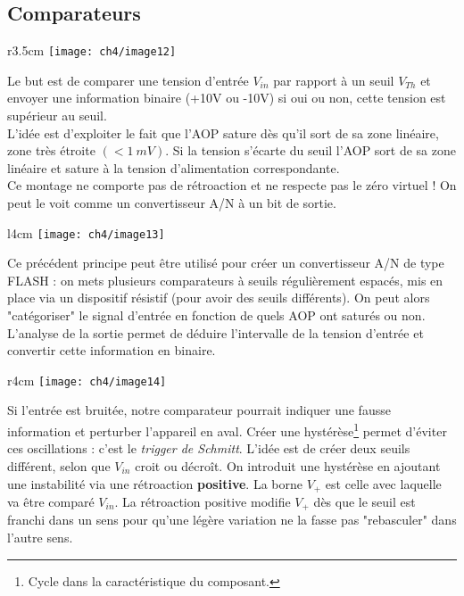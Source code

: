 	\subsection{Comparateurs}
	\begin{wrapfigure}[9]{r}{3.5cm}
	\vspace{-0.5cm}
	\texttt{[image: ch4/image12]}
	\end{wrapfigure}
	Le but est de comparer une tension d'entrée $V_{in}$ par rapport à
	un seuil $V_{Th}$ et envoyer une information binaire (+10V ou -10V) 
	si oui ou non, cette tension est supérieur au seuil. \\
	L'idée est d'exploiter le fait que l'AOP sature dès qu'il sort de sa zone 
	linéaire, zone très étroite $(<1\ mV)$. Si la tension s'écarte du seuil 
	l'AOP sort de sa zone linéaire et sature à la tension d'alimentation 
	correspondante.\\
	\danger Ce montage ne comporte pas de rétroaction et ne respecte pas le 
	zéro virtuel ! On peut le voit comme un convertisseur A/N à un bit de 
	sortie.\\

	\begin{wrapfigure}[9]{l}{4cm}
	\vspace{-0.98cm}
	\texttt{[image: ch4/image13]}
	\end{wrapfigure}	
	Ce précédent principe peut être utilisé pour créer un convertisseur A/N 
	de type FLASH : on mets plusieurs comparateurs à seuils régulièrement 
	espacés, mis en place via un dispositif résistif (pour avoir des seuils 
	différents). On peut alors "catégoriser" le signal d'entrée en fonction 
	de quels AOP ont saturés ou non. L'analyse de la sortie permet de déduire 
	l'intervalle de la tension d'entrée et convertir cette information en 
	binaire.\\

	\begin{wrapfigure}[6]{r}{4cm}
	\vspace{-0.98cm}
	\texttt{[image: ch4/image14]}
	\end{wrapfigure}		
	Si l'entrée est bruitée, notre comparateur pourrait indiquer une fausse 
	information et perturber l'appareil en aval. Créer une hystérèse\footnote{
	Cycle dans la caractéristique du composant.} permet d'éviter ces 
	oscillations : c'est le \textit{trigger de Schmitt}. L'idée est de créer 
	deux seuils différent, selon que $V_{in}$ croit ou décroît. On introduit 
	une hystérèse en ajoutant une instabilité via une rétroaction 
	\textbf{positive}. La borne $V_+$ est celle avec laquelle va être comparé 
	$V_{in}$. La rétroaction positive modifie $V_+$ dès que le seuil est 
	franchi dans un sens pour qu'une légère variation ne la fasse pas 
	"rebasculer" dans l'autre sens.\\
	
